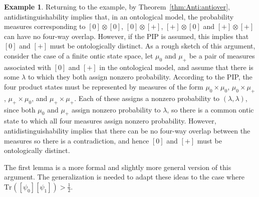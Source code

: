 \documentclass[DIV=calc,fontsize=12pt]{scrartcl} %
\theoremstyle{definition}
\newtheorem{example}[definition]{Example}
\theoremstyle{plain}
\newcommand{\Proj}[1]{\ensuremath{\left [ #1 \right ]}}
\newcommand{\Tr}[2][]{\ensuremath{\text{Tr}_{#1} \left ( #2 \right )}}
\begin{document}
\begin{example}
Returning to the example, by Theorem~\ref{thm:Anti:antiover},
antidistinguishability implies that, in an ontological model, the
probability measures corresponding to $\Proj{0}\otimes \Proj{0}$,
$\Proj{0} \otimes \Proj{+}$, $\Proj{+} \otimes \Proj{0}$ and
$\Proj{+} \otimes \Proj{+}$ can have no four-way overlap.  However,
if the PIP is assumed, this implies that $\Proj{0}$ and $\Proj{+}$
must be ontologically distinct.  As a rough sketch of this argument,
consider the case of a finite ontic state space, let $\mu_{0}$ and
$\mu_{+}$ be a pair of measures associated with $\Proj{0}$ and
$\Proj{+}$ in the ontological model, and assume that there is some
$\lambda$ to which they both assign nonzero probability.  According
to the PIP, the four product states must be represented by measures
of the form $\mu_{0} \times \mu_{0}$, $\mu_{0} \times \mu_{+}$,
$\mu_{+} \times \mu_{0}$, and $\mu_{+} \times \mu_{+}$.  Each of
these assigns a nonzero probability to $(\lambda, \lambda)$, since
both $\mu_{0}$ and $\mu_{+}$ assign nonzero probability to
$\lambda$, so there is a common ontic state to which all four
measures assign nonzero probability.  However,
antidistinguishability implies that there can be no four-way overlap
between the measures so there is a contradiction, and hence
$\Proj{0}$ and $\Proj{+}$ must be ontologically distinct.

The first lemma is a more formal and slightly more general version
of this argument.  The generalization is needed to adapt these ideas
to the case where $\Tr{\Proj{\psi_0}\Proj{\psi_1}} > \frac{1}{2}$.
\end{example}
\end{document}
